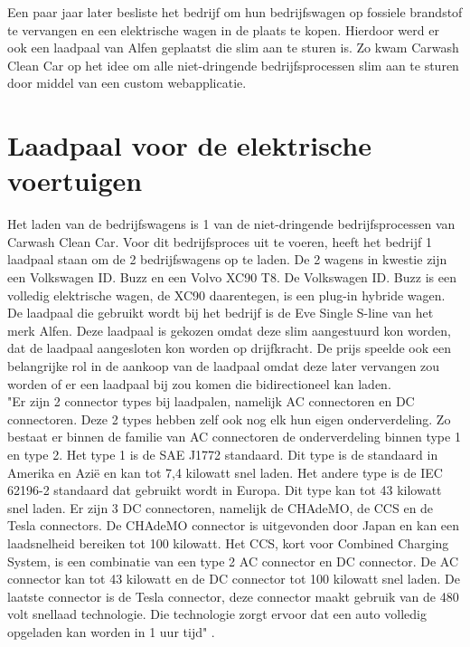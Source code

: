 \pagebreak

Een paar jaar later besliste het bedrijf om hun bedrijfswagen op fossiele brandstof te vervangen en een elektrische wagen in de plaats te kopen. Hierdoor werd er ook een laadpaal van Alfen geplaatst die slim aan te sturen is. Zo kwam Carwash Clean Car op het idee om alle niet-dringende bedrijfsprocessen slim aan te sturen door middel van een custom webapplicatie.

\section{Laadpaal voor de elektrische voertuigen}
\label{sec:stand-van-zaken-laadpaal}

Het laden van de bedrijfswagens is 1 van de niet-dringende bedrijfsprocessen van Carwash Clean Car. Voor dit bedrijfsproces uit te voeren, heeft het bedrijf 1 laadpaal staan om de 2 bedrijfswagens op te laden. De 2 wagens in kwestie zijn een Volkswagen ID. Buzz en een Volvo XC90 T8. De Volkswagen ID. Buzz is een volledig elektrische wagen, de XC90 daarentegen, is een plug-in hybride wagen. De laadpaal die gebruikt wordt bij het bedrijf is de Eve Single S-line van het merk Alfen. Deze laadpaal is gekozen omdat deze slim aangestuurd kon worden, dat de laadpaal aangesloten kon worden op drijfkracht. De prijs speelde ook een belangrijke rol in de aankoop van de laadpaal omdat deze later vervangen zou worden of er een laadpaal bij zou komen die bidirectioneel kan laden.\\

"Er zijn 2 connector types bij laadpalen, namelijk AC connectoren en DC connectoren. Deze 2 types hebben zelf ook nog elk hun eigen onderverdeling. Zo bestaat er binnen de familie van AC connectoren de onderverdeling binnen type 1 en type 2. Het type 1 is de SAE J1772 standaard. Dit type is de standaard in Amerika en Azië en kan tot 7,4 kilowatt snel laden. Het andere type is de IEC 62196-2 standaard dat gebruikt wordt in Europa. Dit type kan tot 43 kilowatt snel laden. Er zijn 3 DC connectoren, namelijk de CHAdeMO, de CCS en de Tesla connectors. De CHAdeMO connector is uitgevonden door Japan en kan een laadsnelheid bereiken tot 100 kilowatt. Het CCS, kort voor  Combined Charging System, is een combinatie van een type 2 AC connector en DC connector. De AC connector kan tot 43 kilowatt en de DC connector tot 100 kilowatt snel laden. De laatste connector is de Tesla connector, deze connector maakt gebruik van de 480 volt snellaad technologie. Die technologie zorgt ervoor dat een auto volledig opgeladen kan worden in 1 uur tijd" \autocite{HEMAVATHI2022105013}. \\

